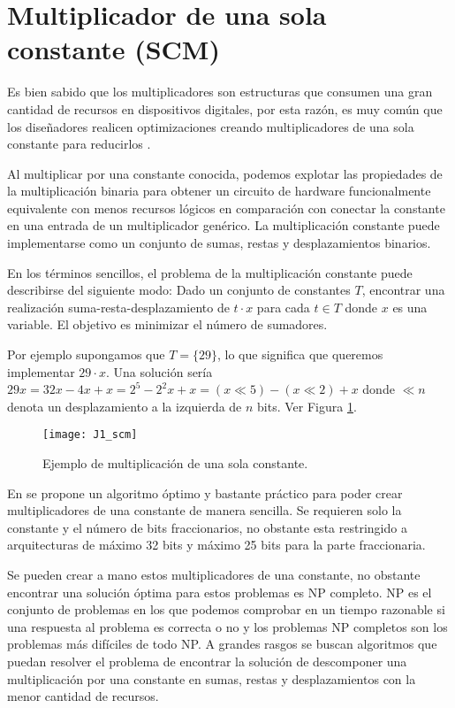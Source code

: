     \section{Multiplicador de una sola constante (SCM)}

        Es bien sabido que los multiplicadores son estructuras que consumen una gran cantidad de recursos en dispositivos digitales, por esta razón, es muy común que los diseñadores realicen optimizaciones creando multiplicadores de una sola constante para reducirlos \cite{Thong2010, GuillenFernandez2019}.

        Al multiplicar por una constante conocida, podemos explotar las propiedades de la multiplicación binaria para obtener un circuito de hardware funcionalmente equivalente con menos recursos lógicos en comparación con conectar la constante en una entrada de un multiplicador genérico. La multiplicación constante puede implementarse como un conjunto de sumas, restas y desplazamientos binarios.

            En los términos sencillos, el problema de la multiplicación constante puede describirse del siguiente modo: Dado un conjunto de constantes $T$, encontrar una realización suma-resta-desplazamiento de $t \cdot x$ para cada $t \in T$ donde $x$ es una variable. El objetivo es minimizar el número de sumadores.
            
            Por ejemplo supongamos que $T = \{29 \}$, lo que significa que queremos implementar $29 \cdot x$. Una solución sería $29x = 32x - 4x +x = 2^{5} - 2^{2}x + x = (x \ll 5) - (x \ll 2) + x$ donde $ \ll n $ denota un desplazamiento a la izquierda de $n$ bits. Ver Figura \ref{fig:J1_scm}.

        \begin{figure}[hbtp]
            \centering
            \texttt{[image: J1\_scm]}
            \caption{Ejemplo de multiplicación de una sola constante.}
            \label{fig:J1_scm}
        \end{figure}
        
        En \cite{Thong2011} se propone un algoritmo óptimo y bastante práctico para poder crear multiplicadores de una constante de manera sencilla. Se requieren solo la constante y el número de bits fraccionarios, no obstante esta restringido a arquitecturas de máximo 32 bits y máximo 25 bits para la parte fraccionaria.

        Se pueden crear a mano estos multiplicadores de una constante, no obstante encontrar una solución óptima para estos problemas es NP completo. NP es el conjunto de problemas en los que podemos comprobar en un tiempo razonable si una respuesta al problema es correcta o no y los problemas NP completos son los problemas más difíciles de todo NP. A grandes rasgos se buscan algoritmos que puedan resolver el problema de encontrar la solución de descomponer una multiplicación por una constante en sumas, restas y desplazamientos con la menor cantidad de recursos.

